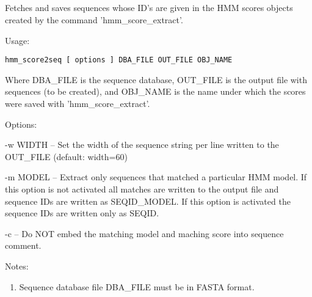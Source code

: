 

\subsection[hmm\_score2seq]{  }



Fetches and saves sequences whose ID's are given in the HMM scores
objects created by the command 'hmm\_score\_extract'.


\begin{description}


\item{Usage:}

{\tt hmm\_score2seq [ options ] DBA\_FILE OUT\_FILE OBJ\_NAME}

Where DBA\_FILE is the sequence database, OUT\_FILE is the output file
with sequences (to be created), and OBJ\_NAME is the name under which
the scores were saved with 'hmm\_score\_extract'.


\item{Options:}
\begin{description}
\item -w WIDTH -- Set the width of the sequence string per line written
to the OUT\_FILE (default: width=60)
\item -m MODEL -- Extract only sequences that matched a particular HMM
model. If this option is not activated all matches are written to
the output file and sequence IDs are written as SEQID\@PFAM\_MODEL.
If this option is activated the sequence IDs are written only as
SEQID.
\item -c -- Do NOT embed the matching model and maching score into sequence
comment.
\end{description}


\item{Notes:}
\begin{enumerate}
\item Sequence database file DBA\_FILE must be in FASTA format.
\end{enumerate}



\end{description}
